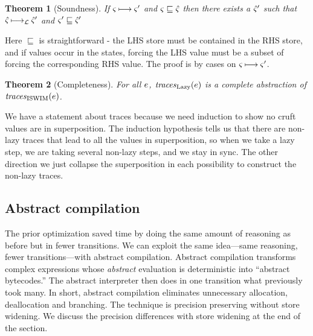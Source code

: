 \documentclass[preprint,onecolumn,9pt]{sigplanconf} %
\newtheorem{theorem}{Theorem}
\begin{document}
\spchoice
{
\begin{theorem}[Soundness]
  If $\varsigma \mathbin{\longmapsto} \varsigma'$ and $\varsigma \sqsubseteq
  \hat{\varsigma}$ then there exists a $\hat{\varsigma}'$ such that $\hat{\varsigma}
  \mathbin{\longmapsto_{{\mathcal L}}} \hat{\varsigma}'$ and $\varsigma' \sqsubseteq \hat{\varsigma}'$
\end{theorem}
Here $\sqsubseteq$ is straightforward - the LHS store must be
contained in the RHS store, and if values occur in the states, forcing
the LHS value must be a subset of forcing the corresponding RHS value.
The proof is by cases on $\varsigma \mathbin{\longmapsto} \varsigma'$.}
{
\begin{theorem}[Completeness]For all $e$,
 $\mathit{traces}_{\text{Lazy}}(e)$ is a complete abstraction of $\mathit{traces}_{\text{ISWIM}}(e)$.
\end{theorem}
We have a statement about traces because we need induction to show no
cruft values are in superposition.  The induction hypothesis tells us
that there are non-lazy traces that lead to all the values in
superposition, so when we take a lazy step, we are taking several
non-lazy steps, and we stay in sync. The other direction we just
collapse the superposition in each possibility to construct the
non-lazy traces.}


\subsection{Abstract compilation}

The prior optimization saved time by doing the same amount of
reasoning as before but in fewer transitions. We can exploit the same
idea---same reasoning, fewer transitions---with abstract
compilation. Abstract compilation transforms complex expressions whose
\emph{abstract} evaluation is deterministic into ``abstract
bytecodes.''  The abstract interpreter then does in one transition
what previously took many. In short, abstract compilation eliminates
unnecessary allocation, deallocation and branching. The technique is
precision preserving without store widening. We discuss the precision
differences with store widening at the end of the section.
\end{document}
